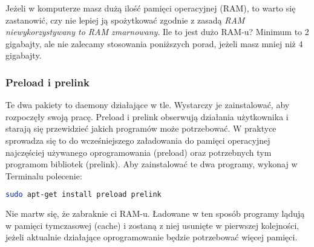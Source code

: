 Jeżeli w komputerze masz dużą ilość pamięci operacyjnej (RAM), to warto się zastanowić, czy nie lepiej ją spożytkować zgodnie z zasadą \emph{RAM niewykorzystywany to RAM zmarnowany}. Ile to jest dużo RAM-u? Minimum to 2 gigabajty, ale nie zalecamy stosowania poniższych porad, jeżeli masz mniej niż 4 gigabajty.

\subsubsection{Preload i prelink}
Te dwa pakiety to daemony działające w tle. Wystarczy je zainstalować, aby rozpoczęły swoją pracę. \textcolor{ubuntu_orange}{Preload i prelink} obserwują działania użytkownika i starają się przewidzieć jakich programów może potrzebować. W praktyce sprowadza się to do wcześniejszego załadowania do pamięci operacyjnej najczęściej używanego oprogramowania (preload) oraz potrzebnych tym programom bibliotek (prelink). Aby zainstalować te dwa programy, wykonaj w Terminalu polecenie:
\begin{lstlisting}[language=bash]
sudo apt-get install preload prelink
\end{lstlisting}
Nie martw się, że zabraknie ci RAM-u. Ładowane w ten sposób programy lądują w pamięci tymczasowej (cache) i zostaną z niej usunięte w pierwszej kolejności, jeżeli aktualnie działające oprogramowanie będzie potrzebować więcej pamięci.

